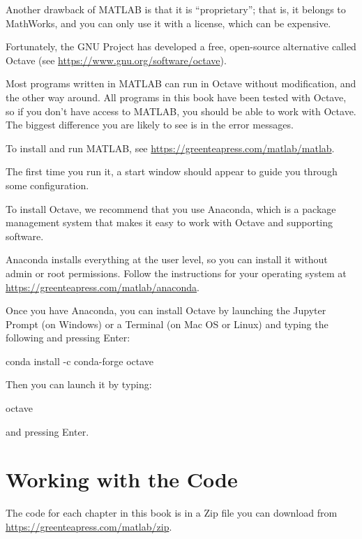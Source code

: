 Another drawback of MATLAB is that it is ``proprietary''; that is, it belongs to MathWorks, and you can only use it with a license, which can be expensive.

Fortunately, the GNU Project has developed a free, open-source alternative called Octave (see \url{https://www.gnu.org/software/octave}).  

Most programs written in MATLAB can run in Octave without modification, and the other way around.  All programs in this book have been tested with Octave, so if you don't have access to MATLAB, you should be able to work with Octave.  The biggest difference you are likely to see is in the error messages.

To install and run MATLAB, see \url{https://greenteapress.com/matlab/matlab}.

The first time you run it, a start window should appear to guide you through some configuration.

To install Octave, we recommend that you use Anaconda, which is a package management system that makes it easy to work with Octave and supporting software.

Anaconda installs everything at the user level, so you can install it without admin or root permissions.  Follow the instructions for your operating system at \url{https://greenteapress.com/matlab/anaconda}.

Once you have Anaconda, you can install Octave by launching the Jupyter Prompt (on Windows) or a Terminal (on Mac OS or Linux) and typing the following and pressing Enter:

\begin{code}
conda install -c conda-forge octave
\end{code}

Then you can launch it by typing:

\begin{code}
octave
\end{code}

and pressing Enter.

\section{Working with the Code}


The code for each chapter in this book is in a Zip file you can download from \url{https://greenteapress.com/matlab/zip}.

